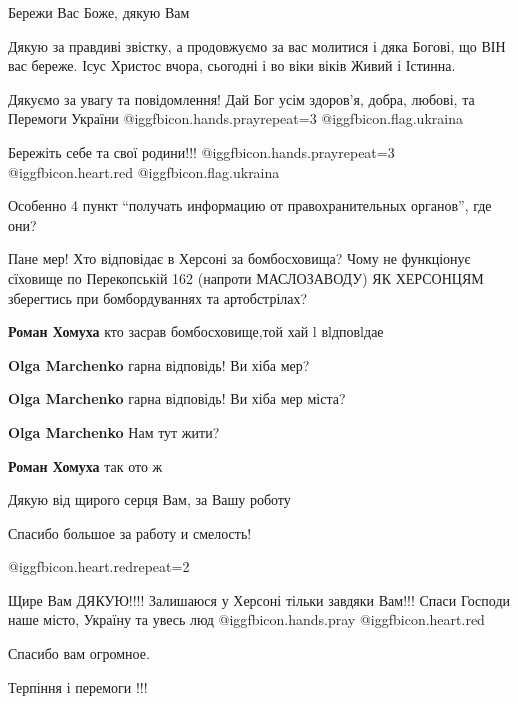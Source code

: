 \begin{itemize}
Бережи Вас Боже, дякую Вам


Дякую за правдиві звістку, а продовжуємо за вас молитися і дяка Богові, що ВІН
вас береже. Ісус Христос вчора, сьогодні і во віки віків Живий і Істинна.


Дякуємо за увагу та повідомлення! Дай Бог усім здоров'я, добра, любові, та
Перемоги України  @igg{fbicon.hands.pray}{repeat=3} @igg{fbicon.flag.ukraina}

Бережіть себе та свої родини!!! @igg{fbicon.hands.pray}{repeat=3} @igg{fbicon.heart.red} ️@igg{fbicon.flag.ukraina}

Особенно 4 пункт \enquote{получать информацию от правохранительных органов}, где они?


Пане мер! Хто відповідає в Херсоні за бомбосховища? Чому не функціонує сїховище
по Перекопській 162 (напроти МАСЛОЗАВОДУ) ЯК ХЕРСОНЦЯМ зберегтись при
бомбордуваннях та артобстрілах?

\begin{itemize} %
\textbf{Роман Хомуха} кто засрав бомбосховище,той хай l вlдповlдае

\textbf{Olga Marchenko} гарна відповідь! Ви хіба мер?

\textbf{Olga Marchenko} гарна відповідь! Ви хіба мер міста?

\textbf{Olga Marchenko} Нам тут жити?

\textbf{Роман Хомуха} так ото ж
\end{itemize} %


Дякую від щирого серця Вам, за Вашу роботу

Спасибо большое за работу и смелость!

@igg{fbicon.heart.red}{repeat=2}


Щире Вам ДЯКУЮ!!!! Залишаюся у Херсоні тільки завдяки Вам!!! Спаси Господи наше
місто, Україну та увесь люд @igg{fbicon.hands.pray} @igg{fbicon.heart.red}

Спасибо вам огромное.

Терпіння і перемоги !!!


\end{itemize}
